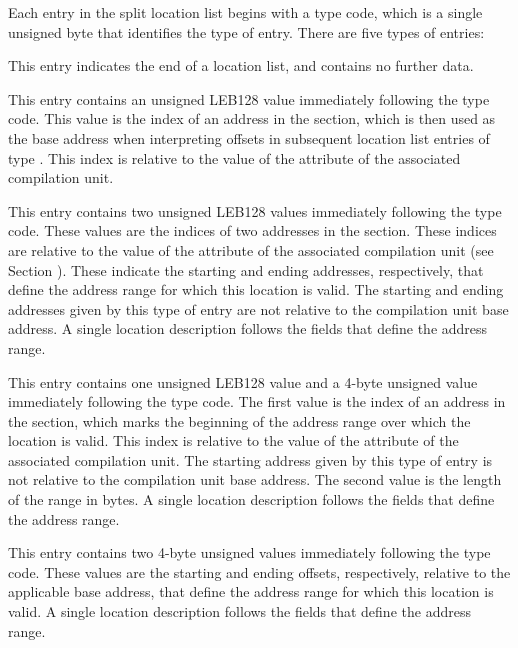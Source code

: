Each entry in the split location list
begins with a type code, which is a single unsigned byte that
identifies the type of entry. There are five types of entries:
\begin{enumerate}
\itembfnl{\DWLLEendoflistentryTARG}
This entry indicates the end of a location list, and
contains no further data.

\itembfnl{\DWLLEbaseaddressselectionentryTARG}
This entry contains an 
unsigned LEB128 value immediately
following the type code. This value is the index of an
address in the \dotdebugaddr{} section, which is then used as
the base address when interpreting offsets in subsequent
location list entries of type \DWLLEoffsetpairentry.
This index is relative to the value of the 
\DWATaddrbase{} attribute of the associated compilation unit.

\itembfnl{\DWLLEstartendentryTARG}
This entry contains two unsigned LEB128
values immediately following the type code. These values are the
indices of two addresses in the \dotdebugaddr{} section.
These indices are relative to the value of the 
\DWATaddrbase{} attribute of the associated compilation unit
(see Section ).
These indicate the starting and ending addresses,
respectively, that define the address range for which
this location is valid. The starting and ending addresses
given by this type of entry are not relative to the
compilation unit base address. A single location
description follows the fields that define the address range.

\itembfnl{\DWLLEstartlengthentryTARG}
This entry contains one unsigned LEB128
value and a 4-byte
unsigned value immediately following the type code. The
first value is the index of an address in the \dotdebugaddr{}
section, which marks the beginning of the address range
over which the location is valid.
This index is relative to the value of the 
\DWATaddrbase{} attribute of the associated compilation unit.
The starting address given by this
type of entry is not relative to the compilation unit
base address. The second value is the
length of the range
\bb
in bytes. 
\eb
A single location
description follows the fields that define the address range.

\itembfnl{\DWLLEoffsetpairentryTARG}
This entry contains two 4-byte unsigned values
immediately following the type code. These values are the
starting and ending offsets, respectively, relative to
the applicable base address, that define the address
range for which this location is valid. A single location
description follows the fields that define the address range.
\end{enumerate}

